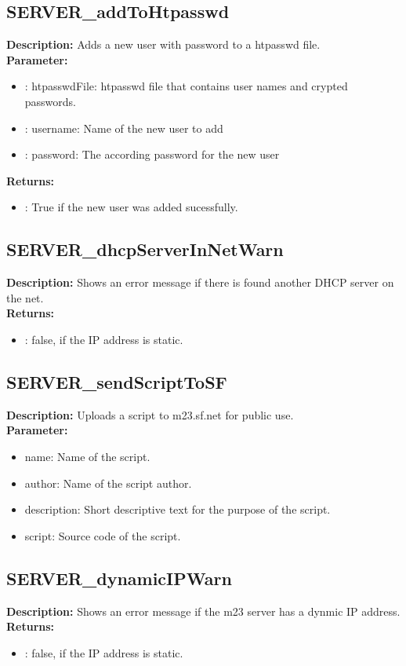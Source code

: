 \subsection{SERVER\_addToHtpasswd}
\textbf{Description:} Adds a new user with password to a htpasswd file.\\
\textbf{Parameter:}
\begin{itemize}
\item : htpasswdFile: htpasswd file that contains user names and crypted passwords.
\item : username: Name of the new user to add
\item : password: The according password for the new user
\end{itemize}
\textbf{Returns:}
\begin{itemize}
\item : True if the new user was added sucessfully.
\end{itemize}

\subsection{SERVER\_dhcpServerInNetWarn}
\textbf{Description:} Shows an error message if there is found another DHCP server on the net.\\
\textbf{Returns:}
\begin{itemize}
\item : false, if the IP address is static.
\end{itemize}

\subsection{SERVER\_sendScriptToSF}
\textbf{Description:} Uploads a script to m23.sf.net for public use.\\
\textbf{Parameter:}
\begin{itemize}
\item name: Name of the script.
\item author: Name of the script author.
\item description: Short descriptive text for the purpose of the script.
\item script: Source code of the script.
\end{itemize}

\subsection{SERVER\_dynamicIPWarn}
\textbf{Description:} Shows an error message if the m23 server has a dynmic IP address.\\
\textbf{Returns:}
\begin{itemize}
\item : false, if the IP address is static.
\end{itemize}

